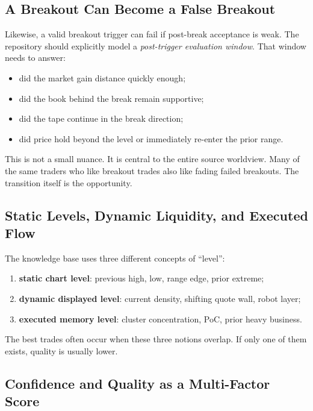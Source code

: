 \subsection{A Breakout Can Become a False Breakout}

Likewise, a valid breakout trigger can fail if post-break acceptance is weak.
The repository should explicitly model a \emph{post-trigger evaluation window}.
That window needs to answer:
\begin{itemize}
  \item did the market gain distance quickly enough;
  \item did the book behind the break remain supportive;
  \item did the tape continue in the break direction;
  \item did price hold beyond the level or immediately re-enter the prior range.
\end{itemize}

This is not a small nuance.
It is central to the entire source worldview.
Many of the same traders who like breakout trades also like fading failed breakouts.
The transition itself is the opportunity.

\subsection{Static Levels, Dynamic Liquidity, and Executed Flow}

The knowledge base uses three different concepts of ``level'':
\begin{enumerate}
  \item \textbf{static chart level}: previous high, low, range edge, prior extreme;
  \item \textbf{dynamic displayed level}: current density, shifting quote wall, robot layer;
  \item \textbf{executed memory level}: cluster concentration, PoC, prior heavy business.
\end{enumerate}

The best trades often occur when these three notions overlap.
If only one of them exists, quality is usually lower.

\subsection{Confidence and Quality as a Multi-Factor Score}


